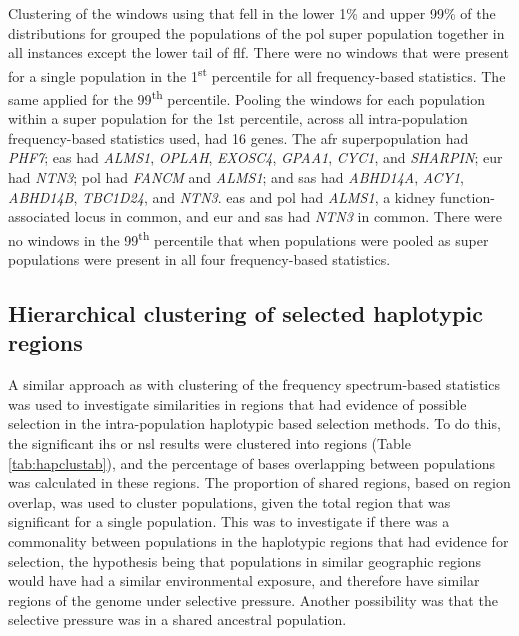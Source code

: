 \documentclass[twoside,openright]{report}
\begin{document}
Clustering of the windows using that fell in the lower 1\% and upper
99\% of the distributions for grouped the populations of the \gls{pol}
super population together in all instances except the lower tail of
\gls{flf}. There were no windows that were present for a single
population in the 1\textsuperscript{st} percentile for all
frequency-based statistics. The same applied for the
99\textsuperscript{th} percentile. Pooling the windows for each
population within a super population for the 1st percentile, across all
intra-population frequency-based statistics used, had 16 genes. The
\gls{afr} superpopulation had \emph{PHF7}; \gls{eas} had \emph{ALMS1},
\emph{OPLAH}, \emph{EXOSC4}, \emph{GPAA1}, \emph{CYC1}, and
\emph{SHARPIN}; \gls{eur} had \emph{NTN3}; \gls{pol} had \emph{FANCM}
and \emph{ALMS1}; and \gls{sas} had \emph{ABHD14A}, \emph{ACY1},
\emph{ABHD14B}, \emph{TBC1D24}, and \emph{NTN3}. \gls{eas} and \gls{pol}
had \emph{ALMS1}, a kidney function-associated locus
\citep{pattaro2016genetic} in common, and \gls{eur} and \gls{sas} had
\emph{NTN3} in common. There were no windows in the
99\textsuperscript{th} percentile that when populations were pooled as
super populations were present in all four frequency-based statistics.

\FloatBarrier

\subsection{Hierarchical clustering of selected haplotypic
regions}\label{hierarchical-clustering-of-selected-haplotypic-regions}

A similar approach as with clustering of the frequency spectrum-based
statistics was used to investigate similarities in regions that had
evidence of possible selection in the intra-population haplotypic based
selection methods. To do this, the significant \gls{ihs} or \gls{nsl}
results were clustered into regions (Table \ref{tab:hapclustab}), and
the percentage of bases overlapping between populations was calculated
in these regions. The proportion of shared regions, based on region
overlap, was used to cluster populations, given the total region that
was significant for a single population. This was to investigate if
there was a commonality between populations in the haplotypic regions
that had evidence for selection, the hypothesis being that populations
in similar geographic regions would have had a similar environmental
exposure, and therefore have similar regions of the genome under
selective pressure. Another possibility was that the selective pressure
was in a shared ancestral population.
\end{document}
